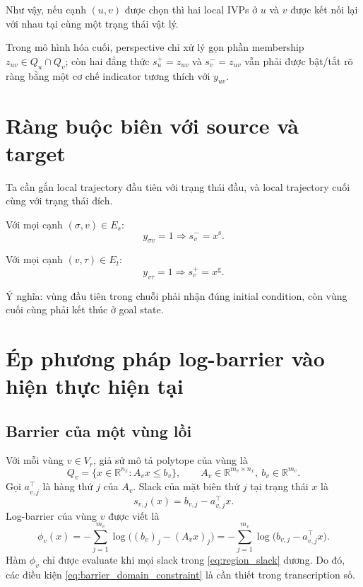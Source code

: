 \documentclass[12pt]{article}
\begin{document}
Như vậy, nếu cạnh $(u,v)$ được chọn thì hai local IVPs ở $u$ và $v$ được kết nối lại với nhau tại cùng một trạng thái vật lý.

Trong mô hình hóa cuối, perspective chỉ xử lý gọn phần membership $z_{uv}\in Q_u\cap Q_v$; còn hai đẳng thức $s_u^+=z_{uv}$ và $s_v^-=z_{uv}$ vẫn phải được bật/tắt rõ ràng bằng một cơ chế indicator tương thích với $y_{uv}$.

\section{Ràng buộc biên với source và target}

Ta cần gắn local trajectory đầu tiên với trạng thái đầu, và local trajectory cuối cùng với trạng thái đích.

Với mọi cạnh $(\sigma,v)\in E_s$:
\begin{equation}
y_{\sigma v}=1 \Longrightarrow s_v^-=x^{\mathrm s}.
\label{eq:source_bc}
\end{equation}

Với mọi cạnh $(v,\tau)\in E_t$:
\begin{equation}
y_{v\tau}=1 \Longrightarrow s_v^+=x^{\mathrm g}.
\label{eq:target_bc}
\end{equation}

Ý nghĩa: vùng đầu tiên trong chuỗi phải nhận đúng initial condition, còn vùng cuối cùng phải kết thúc ở goal state.


\section{Ép phương pháp log-barrier vào hiện thực hiện tại}

\subsection{Barrier của một vùng lồi}

Với mỗi vùng $v\in V_r$, giả sử mô tả polytope của vùng là
\begin{equation}
Q_v=\{x\in\mathbb R^{n_x}:A_vx\le b_v\},
\qquad A_v\in\mathbb R^{m_v\times n_x},\ b_v\in\mathbb R^{m_v}.
\label{eq:region_polytope_log}
\end{equation}
Gọi $a_{v,j}^\top$ là hàng thứ $j$ của $A_v$. Slack của mặt biên thứ $j$ tại trạng thái $x$ là
\begin{equation}
s_{v,j}(x)=b_{v,j}-a_{v,j}^\top x.
\label{eq:region_slack}
\end{equation}
Log-barrier của vùng $v$ được viết là
\begin{equation}
\phi_v(x)
=
-\sum_{j=1}^{m_v}\log\bigl((b_v)_j-(A_vx)_j\bigr)
=
-\sum_{j=1}^{m_v}\log\bigl(b_{v,j}-a_{v,j}^\top x\bigr).
\label{eq:region_log_barrier}
\end{equation}
Hàm $\phi_v$ chỉ được evaluate khi mọi slack trong \eqref{eq:region_slack} dương. Do đó, các điều kiện \eqref{eq:barrier_domain_constraint} là cần thiết trong transcription số.
\end{document}
